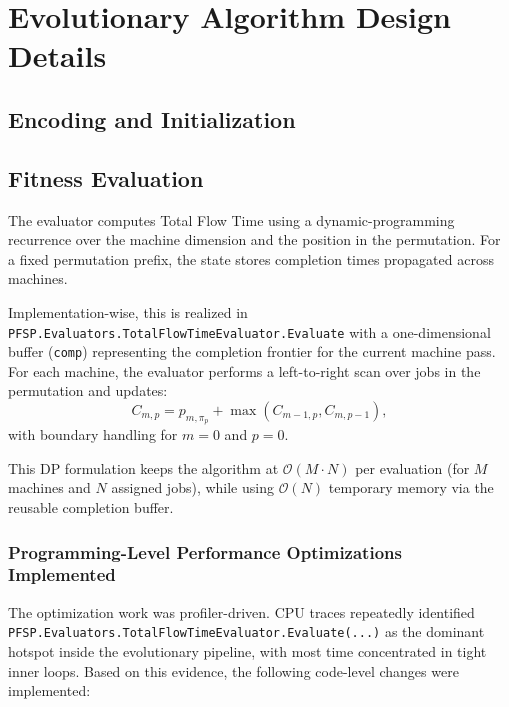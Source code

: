 \documentclass[12pt,a4paper]{report}
\begin{document}
\chapter{Evolutionary Algorithm Design Details}
\section{Encoding and Initialization}

\section{Fitness Evaluation}
The evaluator computes Total Flow Time using a dynamic-programming recurrence over the machine dimension and the position in the permutation.
For a fixed permutation prefix, the state stores completion times propagated across machines.

Implementation-wise, this is realized in \texttt{PFSP.Evaluators.TotalFlowTimeEvaluator.Evaluate} with a one-dimensional buffer
(\texttt{comp}) representing the completion frontier for the current machine pass. For each machine, the evaluator performs a left-to-right scan over jobs in the permutation and updates:
\[
C_{m,p} = p_{m,\pi_p} + \max(C_{m-1,p}, C_{m,p-1}),
\]
with boundary handling for \(m=0\) and \(p=0\).

This DP formulation keeps the algorithm at \(\mathcal{O}(M\cdot N)\) per evaluation (for \(M\) machines and \(N\) assigned jobs),
while using \(\mathcal{O}(N)\) temporary memory via the reusable completion buffer.
\subsection{Programming-Level Performance Optimizations Implemented}
The optimization work was profiler-driven. CPU traces repeatedly identified
\texttt{PFSP.Evaluators.TotalFlowTimeEvaluator.Evaluate(...)} as the dominant hotspot inside the evolutionary
pipeline, with most time concentrated in tight inner loops. Based on this evidence, the following code-level
changes were implemented:
\end{document}
